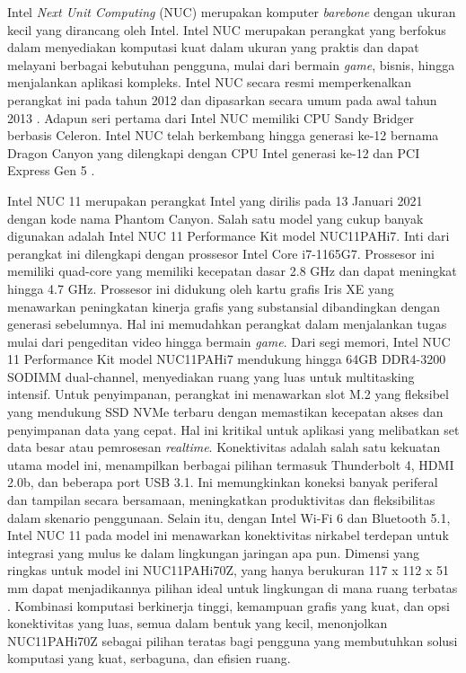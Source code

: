 Intel \emph{Next Unit Computing} (NUC) merupakan komputer \emph{barebone} dengan ukuran kecil yang dirancang oleh Intel. Intel NUC merupakan perangkat yang berfokus dalam menyediakan komputasi kuat dalam ukuran yang praktis dan dapat melayani berbagai kebutuhan pengguna, mulai dari bermain \emph{game}, bisnis, hingga menjalankan aplikasi kompleks. Intel NUC secara resmi memperkenalkan perangkat ini pada tahun 2012 dan dipasarkan secara umum pada awal tahun 2013 \parencite{IntelNUC2020}. Adapun seri pertama dari Intel NUC memiliki CPU Sandy Bridger berbasis Celeron. Intel NUC telah berkembang hingga generasi ke-12 bernama Dragon Canyon yang dilengkapi dengan CPU Intel generasi ke-12 dan PCI Express Gen 5 \parencite{Halfacree2013}.

Intel NUC 11 merupakan perangkat Intel yang dirilis pada 13 Januari 2021 dengan kode nama Phantom Canyon. Salah satu model yang cukup banyak digunakan adalah Intel NUC 11 Performance Kit model NUC11PAHi7. Inti dari perangkat ini dilengkapi dengan prossesor Intel Core i7-1165G7. Prossesor ini memiliki quad-core yang memiliki kecepatan dasar 2.8 GHz dan dapat meningkat hingga 4.7 GHz.  Prossesor ini didukung oleh kartu grafis Iris XE yang menawarkan peningkatan kinerja grafis yang substansial dibandingkan dengan generasi sebelumnya. Hal ini memudahkan perangkat dalam menjalankan tugas mulai dari pengeditan video hingga bermain \emph{game}. Dari segi memori, Intel NUC 11 Performance Kit model NUC11PAHi7 mendukung hingga 64GB DDR4-3200 SODIMM dual-channel, menyediakan ruang yang luas untuk multitasking intensif. Untuk penyimpanan, perangkat ini menawarkan slot M.2 yang fleksibel yang mendukung SSD NVMe terbaru dengan memastikan kecepatan akses dan penyimpanan data yang cepat. Hal ini kritikal untuk aplikasi yang melibatkan set data besar atau pemrosesan \emph{realtime}. Konektivitas adalah salah satu kekuatan utama model ini, menampilkan berbagai pilihan termasuk Thunderbolt 4, HDMI 2.0b, dan beberapa port USB 3.1. Ini memungkinkan koneksi banyak periferal dan tampilan secara bersamaan, meningkatkan produktivitas dan fleksibilitas dalam skenario penggunaan. Selain itu, dengan Intel Wi-Fi 6 dan Bluetooth 5.1, Intel NUC 11 pada model ini menawarkan konektivitas nirkabel terdepan untuk integrasi yang mulus ke dalam lingkungan jaringan apa pun. Dimensi yang ringkas untuk model ini NUC11PAHi70Z, yang hanya berukuran 117 x 112 x 51 mm dapat menjadikannya pilihan ideal untuk lingkungan di mana ruang terbatas \parencite{ASUS2024}. Kombinasi komputasi berkinerja tinggi, kemampuan grafis yang kuat, dan opsi konektivitas yang luas, semua dalam bentuk yang kecil, menonjolkan NUC11PAHi70Z sebagai pilihan teratas bagi pengguna yang membutuhkan solusi komputasi yang kuat, serbaguna, dan efisien ruang.

